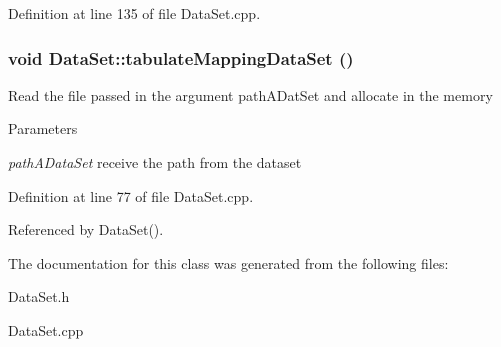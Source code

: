 Definition at line 135 of file DataSet.cpp.\hypertarget{classDataSet_a8a5fa42fd383c845b2896fd7f3e4cce4}{
\subsubsection[{tabulateMappingDataSet}]{\setlength{\rightskip}{0pt plus 5cm}void DataSet::tabulateMappingDataSet ()}}
\label{classDataSet_a8a5fa42fd383c845b2896fd7f3e4cce4}
Read the file passed in the argument pathADatSet and allocate in the memory 
\begin{DoxyParams}{Parameters}
\item[{\em pathADataSet}]receive the path from the dataset \end{DoxyParams}


Definition at line 77 of file DataSet.cpp.

Referenced by DataSet().

The documentation for this class was generated from the following files:\begin{DoxyCompactItemize}
\item 
DataSet.h\item 
DataSet.cpp\end{DoxyCompactItemize}

